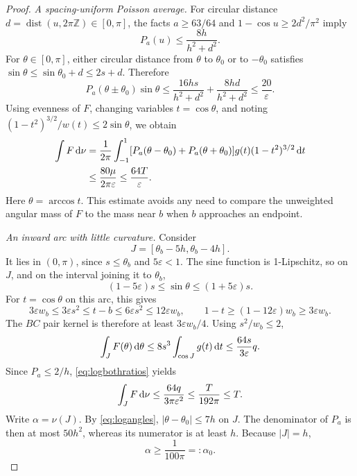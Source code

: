 \begin{proof}
\emph{A spacing-uniform Poisson average.}
For circular distance $d=\operatorname{dist}(u,2\pi\mathbb Z)\in[0,\pi]$, the facts $a\ge63/64$ and $1-\cos u\ge2d^2/\pi^2$ imply
\[
P_a(u)\le\frac{8h}{h^2+d^2}.
\]
For $\theta\in[0,\pi]$, either circular distance from $\theta$ to $\theta_0$ or to $-\theta_0$ satisfies
$\sin\theta\le\sin\theta_0+d\le2s+d$. Therefore
\[
P_a(\theta\pm\theta_0)\sin\theta
\le\frac{16hs}{h^2+d^2}+\frac{8hd}{h^2+d^2}
\le\frac{20}{\varepsilon}.
\]
Using evenness of $F$, changing variables $t=\cos\theta$, and noting
$(1-t^2)^{3/2}/w(t)\le2\sin\theta$, we obtain
\begin{align}
\int F\,\mathrm d\nu
&=\frac1{2\pi}\int_{-1}^1
 [P_a(\theta-\theta_0)+P_a(\theta+\theta_0)]
 g(t)(1-t^2)^{3/2}\,\mathrm d t \notag\\
&\le\frac{80\mu}{2\pi\varepsilon}
\le\frac{64T}{\varepsilon}.
\label{eq:logpoissonwhole}
\end{align}
Here $\theta=\arccos t$. This estimate avoids any need to compare the unweighted angular mass of $F$ to the mass near $b$ when $b$ approaches an endpoint.

\emph{An inward arc with little curvature.}
Consider
\[
J=[\theta_b-5h,\theta_b-4h].
\]
It lies in $(0,\pi)$, since $s\le\theta_b$ and $5\varepsilon<1$. The sine function is 1-Lipschitz, so on $J$, and on the interval joining it to $\theta_b$,
\[
(1-5\varepsilon)s\le\sin\theta\le(1+5\varepsilon)s.
\]
For $t=\cos\theta$ on this arc, this gives
\[
3\varepsilon w_b\le3\varepsilon s^2\le t-b
\le6\varepsilon s^2\le12\varepsilon w_b,
\qquad
1-t\ge(1-12\varepsilon)w_b\ge3\varepsilon w_b.
\]
The $BC$ pair kernel is therefore at least $3\varepsilon w_b/4$. Using $s^2/w_b\le2$,
\[
\int_JF(\theta)\,\mathrm d\theta
\le8s^3\int_{\cos J}g(t)\,\mathrm d t
\le\frac{64s}{3\varepsilon}q.
\]
Since $P_a\le2/h$, \eqref{eq:logbothratios} yields
\begin{equation}
\int_JF\,\mathrm d\nu
\le\frac{64q}{3\pi\varepsilon^2}
\le\frac{T}{192\pi}\le T.
\label{eq:logleakage}
\end{equation}
Write $\alpha=\nu(J)$. By \eqref{eq:logangles},
$|\theta-\theta_0|\le7h$ on $J$. The denominator of $P_a$ is then at most $50h^2$, whereas its numerator is at least $h$. Because $|J|=h$,
\begin{equation}
\alpha\ge\frac1{100\pi}=:\alpha_0.
\label{eq:logharmonicmass}
\end{equation}


\end{proof}
